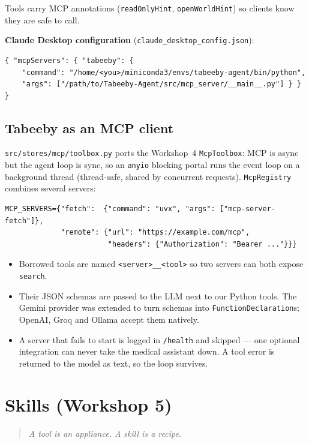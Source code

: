 \documentclass[11pt,a4paper]{article}
\newcommand{\code}[1]{\texttt{#1}}
\begin{document}
Tools carry MCP annotations (\code{readOnlyHint}, \code{openWorldHint}) so clients know they are safe to call.

\textbf{Claude Desktop configuration} (\code{claude\_desktop\_config.json}):
\begin{lstlisting}
{ "mcpServers": { "tabeeby": {
    "command": "/home/<you>/miniconda3/envs/tabeeby-agent/bin/python",
    "args": ["/path/to/Tabeeby-Agent/src/mcp_server/__main__.py"] } } }
\end{lstlisting}

\subsection{Tabeeby as an MCP client}
\code{src/stores/mcp/toolbox.py} ports the Workshop~4 \code{McpToolbox}: MCP is async but the agent loop is sync, so an \code{anyio} blocking portal runs the event loop on a background thread (thread-safe, shared by concurrent requests). \code{McpRegistry} combines several servers:

\begin{lstlisting}
MCP_SERVERS={"fetch":  {"command": "uvx", "args": ["mcp-server-fetch"]},
             "remote": {"url": "https://example.com/mcp",
                        "headers": {"Authorization": "Bearer ..."}}}
\end{lstlisting}

\begin{itemize}
  \item Borrowed tools are named \code{<server>\_\_<tool>} so two servers can both expose \code{search}.
  \item Their JSON schemas are passed to the LLM next to our Python tools. The Gemini provider was extended to turn schemas into \code{FunctionDeclaration}s; OpenAI, Groq and Ollama accept them natively.
  \item A server that fails to start is logged in \code{/health} and skipped --- one optional integration can never take the medical assistant down. A tool error is returned to the model as text, so the loop survives.
\end{itemize}

\section{Skills (Workshop 5)}

\begin{quote}\itshape A tool is an appliance. A skill is a recipe.\end{quote}
\end{document}
